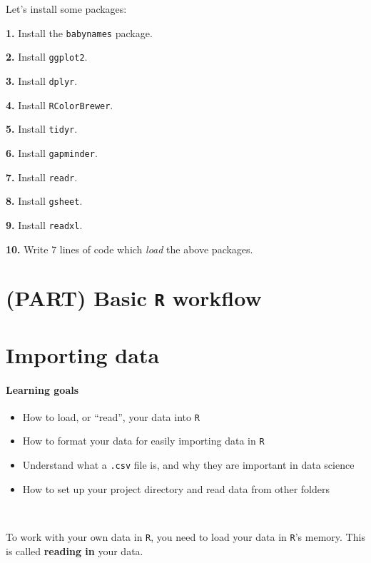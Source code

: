 \documentclass[
]{book}
\providecommand{\tightlist}{%
  \setlength{\itemsep}{0pt}\setlength{\parskip}{0pt}}
\begin{document}
Let's install some packages:

\textbf{1.} Install the \texttt{babynames} package.

\textbf{2.} Install \texttt{ggplot2}.

\textbf{3.} Install \texttt{dplyr}.

\textbf{4.} Install \texttt{RColorBrewer}.

\textbf{5.} Install \texttt{tidyr}.

\textbf{6.} Install \texttt{gapminder}.

\textbf{7.} Install \texttt{readr}.

\textbf{8.} Install \texttt{gsheet}.

\textbf{9.} Install \texttt{readxl}.

\textbf{10.} Write 7 lines of code which \emph{load} the above packages.

\hypertarget{part-basic-r-workflow}{%
\chapter*{\texorpdfstring{(PART) Basic \texttt{R} workflow}{(PART) Basic R workflow}}\label{part-basic-r-workflow}}

\hypertarget{importing-data}{%
\chapter{Importing data}\label{importing-data}}

\hypertarget{learning-goals-7}{%
\subsubsection*{Learning goals}\label{learning-goals-7}}

\begin{itemize}
\tightlist
\item
  How to load, or ``read'', your data into \texttt{R}
\item
  How to format your data for easily importing data in \texttt{R}
\item
  Understand what a \texttt{.csv} file is, and why they are important in data science
\item
  How to set up your project directory and read data from other folders
\end{itemize}

~

To work with your own data in \texttt{R}, you need to load your data in \texttt{R}'s memory. This is called \textbf{reading in} your data.
\end{document}
